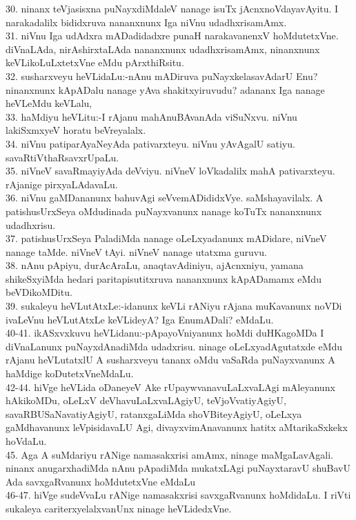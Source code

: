 \documentclass{article}
\begin{document}
30. ninanx teVjasisxna puNayxdiMdaleV nanage isuTx jAcnxnoVdayavAyitu. I narakadalilx bididxruva nananxnunx Iga niVnu udadhxrisamAmx.\\
31. niVnu Iga udAdxra mADadidadxre punaH narakavanenxV hoMdutetxVne. diVnaLAda, nirAshirxtaLAda nananxnunx udadhxrisamAmx, ninanxnunx keVLikoLuLxtetxVne eMdu pArxthiRsitu.\\
32. susharxveyu heVLidaLu:-nAnu mADiruva puNayxkelasavAdarU Enu? ninanxnunx kApADalu nanage yAva shakitxyiruvudu? adananx Iga nanage heVLeMdu keVLalu,\\
33. haMdiyu heVLitu:-I rAjanu mahAnuBAvanAda viSuNxvu. niVnu lakiSxmxyeV horatu beVreyalalx.\\
34. niVnu patiparAyaNeyAda pativarxteyu. niVnu yAvAgalU satiyu. savaRtiVthaRsavxrUpaLu.\\
35. niVneV savaRmayiyAda deVviyu. niVneV loVkadalilx mahA pativarxteyu. rAjanige pirxyaLAdavaLu.\\
36. niVnu gaMDananunx bahuvAgi seVvemADididxVye. saMshayavilalx. A patishusUrxSeya oMdudinada puNayxvanunx nanage koTuTx nananxnunx udadhxrisu.\\
37. patishusUrxSeya PaladiMda nanage oLeLxyadanunx mADidare, niVneV nanage taMde. niVneV tAyi. niVneV nanage utatxma guruvu.\\
38. nAnu pApiyu, durAcAraLu, anaqtavAdiniyu, ajAcnxniyu, yamana shikeSxyiMda hedari paritapisutitxruva nananxnunx kApADamamx eMdu beVDikoMDitu.\\
39. sukaleyu heVLutAtxLe:-idanunx keVLi rANiyu rAjana muKavanunx noVDi ivaLeVnu heVLutAtxLe keVLideyA? Iga EnumADali? eMdaLu.\\
40-41. ikASxvxkuvu heVLidanu:-pApayoVniyanunx hoMdi duHKagoMDa I diVnaLanunx puNayxdAnadiMda udadxrisu. ninage oLeLxyadAgutatxde eMdu rAjanu heVLutatxlU A susharxveyu tananx oMdu vaSaRda puNayxvanunx A haMdige koDutetxVneMdaLu.\\
42-44. hiVge heVLida oDaneyeV Ake rUpaywvanavuLaLxvaLAgi mAleyanunx hAkikoMDu, oLeLxV deVhavuLaLxvaLAgiyU, teVjoVvatiyAgiyU, savaRBUSaNavatiyAgiyU, ratanxgaLiMda shoVBiteyAgiyU, oLeLxya gaMdhavanunx leVpisidavaLU Agi, divayxvimAnavanunx hatitx aMtarikaSxkekx hoVdaLu.\\
45. Aga A suMdariyu rANige namasakxrisi amAmx, ninage maMgaLavAgali. ninanx anugarxhadiMda nAnu pApadiMda mukatxLAgi puNayxtaravU shuBavU Ada savxgaRvanunx hoMdutetxVne eMdaLu\\
46-47. hiVge sudeVvaLu rANige namasakxrisi savxgaRvanunx hoMdidaLu. I riVti sukaleya cariterxyelalxvanUnx ninage heVLidedxVne.\\
\end{document}
